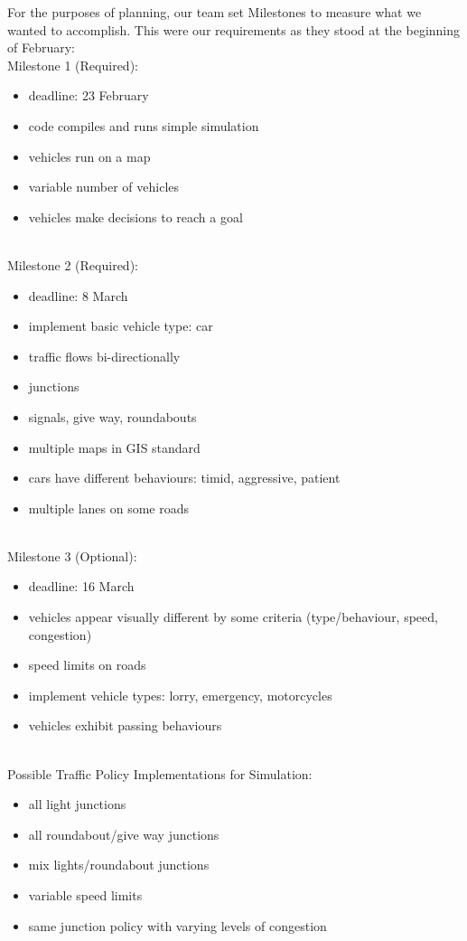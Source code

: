 \documentclass[11pt]{article}
\begin{document}
For the purposes of planning, our team set Milestones to measure what we wanted to accomplish. This were our requirements as they stood at the beginning of February: 
\\
Milestone 1 (Required):
\begin{itemize}\itemsep0pt
\item deadline: 23 February
\item code compiles and runs simple simulation
\item vehicles run on a map
\item variable number of vehicles
\item vehicles make decisions to reach a goal
\end{itemize}
\\
Milestone 2 (Required):
\begin{itemize}\itemsep0pt
\item deadline: 8 March
\item implement basic vehicle type: car
\item traffic flows bi-directionally
\item junctions
\item signals, give way, roundabouts
\item multiple maps in GIS standard
\item cars have different behaviours: timid, aggressive, patient
\item multiple lanes on some roads
\end{itemize}
\\
Milestone 3 (Optional):
\begin{itemize}\itemsep0pt
\item deadline: 16 March
\item vehicles appear visually different by some criteria (type/behaviour, speed, congestion)
\item speed limits on roads
\item implement vehicle types: lorry, emergency, motorcycles
\item vehicles exhibit passing behaviours
\end{itemize}
\\
Possible Traffic Policy Implementations for Simulation:
\begin{itemize}\itemsep0pt
\item all light junctions
\item all roundabout/give way junctions
\item mix lights/roundabout junctions
\item variable speed limits
\item same junction policy with varying levels of congestion
\end{itemize}
\\
\end{document}
